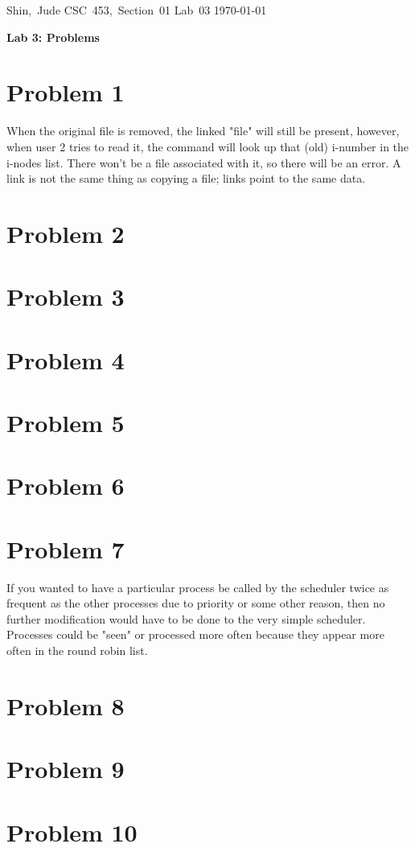 \documentclass[11pt]{article}
\begin{document}
\hfill\vbox{\hbox{Shin, Jude}
		\hbox{CSC 453, Section 01}	
		\hbox{Lab 03}	
		\hbox{\today}}\par

\bigskip
\centerline{\Large\bf Lab 3: Problems}\par
\bigskip

\section*{Problem 1}
When the original file is removed, the linked "file" will still be present, 
however, when user 2 tries to read it, the command will look up that (old)
i-number in the i-nodes list. There won't be a file associated with it, so 
there will be an error. A link is not the same thing as copying a file; links
point to the same data. 


\section*{Problem 2}


\section*{Problem 3}


\section*{Problem 4}


\section*{Problem 5}


\section*{Problem 6}


\section*{Problem 7}
If you wanted to have a particular process be called by the scheduler twice as
frequent as the other processes due to priority or some other reason, then
no further modification would have to be done to the very simple scheduler.
Processes could be "seen" or processed more often because they appear more often
in the round robin list.


\section*{Problem 8}


\section*{Problem 9}


\section*{Problem 10}
\end{document}
